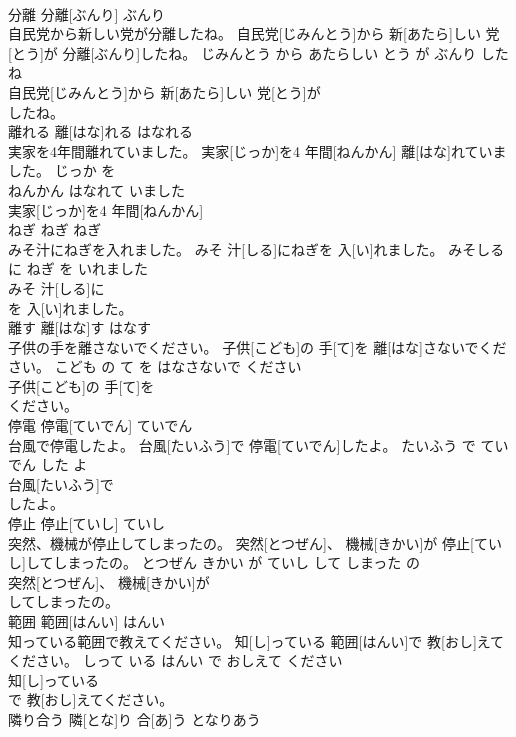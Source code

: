 \documentclass[8pt]{extreport}
\begin{document}
\begin{CJK}{UTF8}{min}
\\	分離	分離[ぶんり]	ぶんり	
\\	自民党から新しい党が分離したね。	自民党[じみんとう]から 新[あたら]しい 党[とう]が 分離[ぶんり]したね。	じみんとう から あたらしい とう が ぶんり した ね	
\\	自民党[じみんとう]から 新[あたら]しい 党[とう]が
\\	したね。			
\\	離れる	離[はな]れる	はなれる	
\\	実家を4年間離れていました。	実家[じっか]を4 年間[ねんかん] 離[はな]れていました。	じっか を 
\\	ねんかん はなれて いました	
\\	実家[じっか]を4 年間[ねんかん]
\\	ねぎ	ねぎ	ねぎ	
\\	みそ汁にねぎを入れました。	みそ 汁[しる]にねぎを 入[い]れました。	みそしる に ねぎ を いれました	
\\	みそ 汁[しる]に
\\	を 入[い]れました。			
\\	離す	離[はな]す	はなす	
\\	子供の手を離さないでください。	子供[こども]の 手[て]を 離[はな]さないでください。	こども の て を はなさないで ください	
\\	子供[こども]の 手[て]を
\\	ください。			
\\	停電	停電[ていでん]	ていでん	
\\	台風で停電したよ。	台風[たいふう]で 停電[ていでん]したよ。	たいふう で ていでん した よ	
\\	台風[たいふう]で
\\	したよ。			
\\	停止	停止[ていし]	ていし	
\\	突然、機械が停止してしまったの。	突然[とつぜん]、 機械[きかい]が 停止[ていし]してしまったの。	とつぜん きかい が ていし して しまった の	
\\	突然[とつぜん]、 機械[きかい]が
\\	してしまったの。			
\\	範囲	範囲[はんい]	はんい	
\\	知っている範囲で教えてください。	知[し]っている 範囲[はんい]で 教[おし]えてください。	しって いる はんい で おしえて ください	
\\	知[し]っている
\\	で 教[おし]えてください。			
\\	隣り合う	隣[とな]り 合[あ]う	となりあう	

\end{CJK}
\end{document}
